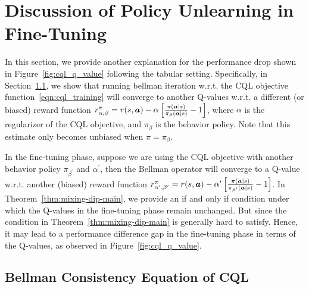 \section{Discussion of Policy Unlearning in Fine-Tuning}

In this section, we provide another explanation for the performance drop shown in Figure~\ref{fig:cql_q_value} following the tabular setting. Specifically, in Section~\ref{subsec:reward-bias}, we show that running bellman iteration w.r.t. the CQL objective function~\eqref{eqn:cql_training} will converge to another Q-values w.r.t. a different (or biased) reward function $r^\pi_{\alpha,\beta}=r(s,\boldsymbol{a}) - \alpha\left[  \frac{\pi(\boldsymbol{a}|s)}{\pi_\beta(\boldsymbol{a}|s)} - 1  \right]$, where $\alpha$ is the regularizer of the CQL objective, and $\pi_\beta$ is the behavior policy. Note that this estimate only becomes unbiased when $\pi=\pi_\beta$.

In the fine-tuning phase, suppose we are using the CQL objective with another behavior policy $\pi_{\beta^\prime}$ and $\alpha^\prime$, then the Bellman operator will converge to a Q-value w.r.t. another (biased) reward function $r^\pi_{\alpha^\prime,\beta^\prime}=r(s,\boldsymbol{a}) - \alpha^\prime\left[  \frac{\pi(\boldsymbol{a}|s)}{\pi_{\beta^\prime}(\boldsymbol{a}|s)} - 1  \right]$. In Theorem~\ref{thm:mixing-dip-main}, we provide an if and only if condition under which the Q-values in the fine-tuning phase remain unchanged. But since the condition in Theorem~\ref{thm:mixing-dip-main} is generally hard to satisfy. Hence, it may lead to a performance difference gap in the fine-tuning phase in terms of the Q-values, as observed in Figure~\ref{fig:cql_q_value}.

\subsection{Bellman Consistency Equation of CQL}
 
\label{subsec:reward-bias}


